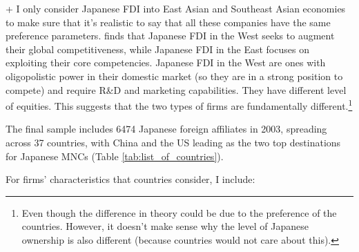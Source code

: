 + I only consider Japanese FDI into East Asian and Southeast Asian economies to
make sure that it's realistic to say that all these companies have the same
preference parameters. \citep{Pak2005} finds that Japanese FDI in the West seeks
to augment their global competitiveness, while Japanese FDI in the East focuses
on exploiting their core competencies. Japanese FDI in the West are ones with
oligopolistic power in their domestic market (so they are in a strong position
to compete) and require R\&D and marketing capabilities. They have different
level of equities. This suggests that the two types of firms are fundamentally
different.\footnote{Even though the difference in theory could be due to the
  preference of the countries. However, it doesn't make sense why the level of
  Japanese ownership is also different (because countries would not care about
  this).} 

The final sample includes 6474 Japanese
foreign affiliates in 2003, spreading across 37 countries, with China and the US
leading as the two top destinations for Japanese MNCs (Table \ref{tab:list_of_countries}).

For firms' characteristics that countries consider, I include:

